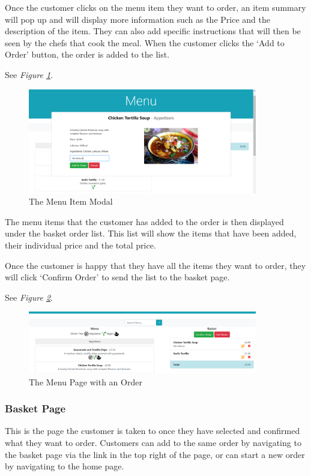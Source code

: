 \documentclass[12pt, twoside, a4paper]{report}
\begin{document}
Once the customer clicks on the menu item they want to order, an item summary will pop up and will display more information such as the Price and the description of the item.
They can also add specific instructions that will then be seen by the chefs that cook the meal.
When the customer clicks the ‘Add to Order’ button, the order is added to the list.

See \textit{Figure \ref{fig:menuItem}}.

\begin{figure}[H]
  \centering
  \includegraphics[width=10cm]{MenuItem.png}
  \caption{The Menu Item Modal}
  \label{fig:menuItem}
\end{figure}

The menu items that the customer has added to the order is then displayed under the basket order list.
This list will show the items that have been added, their individual price and the total price.

Once the customer is happy that they have all the items they want to order, they will click ‘Confirm Order’ to send the list to the basket page. 

See \textit{Figure \ref{fig:menuOrder}}.

\begin{figure}[H]
  \centering
  \includegraphics[width=10cm]{MenuOrder.png}
  \caption{The Menu Page with an Order}
  \label{fig:menuOrder}
\end{figure}

\subsubsection*{Basket Page} 

This is the page the customer is taken to once they have selected and confirmed what they want to order.
Customers can add to the same order by navigating to the basket page via the link in the top right of the page, or can start a new order by navigating to the home page.
\end{document}
